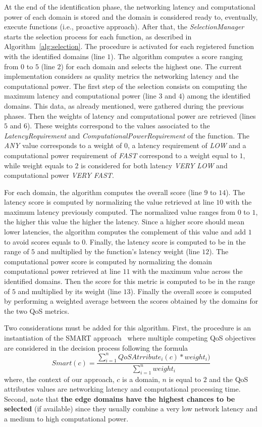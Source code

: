 At the end of the identification phase, the networking latency and computational power of each domain is stored and the domain is considered ready to, eventually, execute functions (i.e., proactive approach). After that, the \textit{SelectionManager} starts the selection process for each function, as described in Algorithm~\ref{alg:selection}. The procedure is activated for each registered function with the identified domains (line $1$). The algorithm computes a score ranging from $0$ to $5$ (line $2$) for each domain and selects the highest one. The current implementation considers as quality metrics the networking latency and the computational power. The first step of the selection consists on computing the maximum latency and computational power (line $3$ and $4$) among the identified domains. This data, as already mentioned, were gathered during the previous phases. Then the weights of latency and computational power are retrieved (lines $5$ and $6$). These weights correspond to the values associated to the \textit{LatencyRequirement} and \textit{ComputationalPowerRequirement} of the function. The \textit{ANY} value corresponds to a weight of $0$, a latency requirement of \textit{LOW} and a computational power requirement of \textit{FAST} correspond to a weight equal to $1$, while weight equals to $2$ is considered for both latency \textit{VERY LOW} and computational power \textit{VERY FAST}.

For each domain, the algorithm computes the overall score (line  $9$ to $14$). The latency score is computed by normalizing the value retrieved at line $10$ with the maximum latency previously computed. The normalized value ranges from $0$ to $1$, the higher this value the higher the latency. Since a higher score should mean lower latencies, the algorithm computes the complement of this value and add $1$ to avoid scores equals to $0$. Finally, the latency score is computed to be in the range of $5$ and multiplied by the function's latency weight (line $12$). The computational power score is computed by normalizing the domain computational power retrieved at line $11$ with the  maximum value across the identified domains. Then the score for this metric is computed to be in the range of $5$ and multiplied by its weight (line $13$). Finally the overall score is computed by performing a weighted average between the scores obtained by the domains for the two QoS metrics.

Two considerations must be added for this algorithm. First, the procedure is an instantiation of the SMART approach~\cite{Olson1996} where multiple competing QoS objectives are considered in the decision process following the formula
\begin{equation}
Smart(c) = \frac{\sum_{i=1}^{n} QoSAtrribute_i(c)*weight_i)}{\sum_{i=1}^{n}weight_i} 
\end{equation}
where, the context of our approach, $c$ is a domain, $n$ is equal to $2$ and the QoS attributes values are networking latency and computational processing time.
Second, note that \textbf{the edge domains have the highest chances to be selected} (if available) since they usually combine a very low network latency and a medium to high computational power. 

